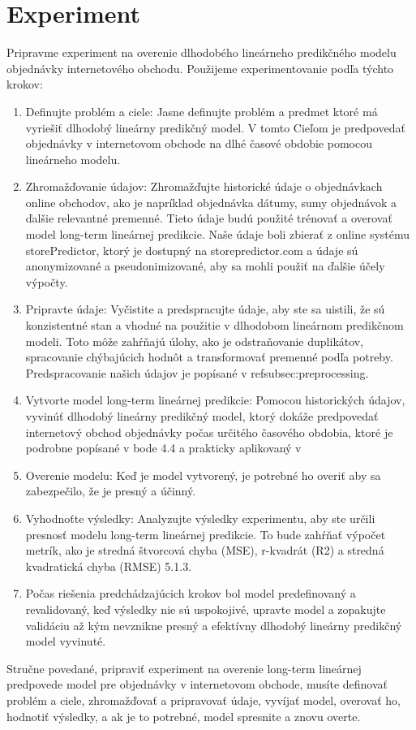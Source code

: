     \section{Experiment}
    Pripravme experiment na overenie dlhodobého lineárneho predikčného modelu objednávky internetového obchodu. Použijeme experimentovanie podľa týchto krokov:
    \begin{enumerate}
    \item Definujte problém a ciele: Jasne definujte problém a predmet ktoré má vyriešiť dlhodobý lineárny predikčný model. V tomto
    Cieľom je predpovedať objednávky v internetovom obchode na dlhé časové obdobie pomocou lineárneho modelu.
    \item  Zhromažďovanie údajov: Zhromažďujte historické údaje o objednávkach online obchodov, ako je napríklad objednávka
    dátumy, sumy objednávok a ďalšie relevantné premenné. Tieto údaje budú použité trénovať a overovať model long-term lineárnej predikcie. Naše údaje boli
    zbierať z online systému storePredictor, ktorý je dostupný na storepredictor.com a údaje sú anonymizované a pseudonimizované,
    aby sa mohli použiť na ďalšie účely výpočty.
    \item  Pripravte údaje: Vyčistite a predspracujte údaje, aby ste sa uistili, že sú konzistentné stan a vhodné na použitie v dlhodobom
    lineárnom predikčnom modeli. Toto môže zahŕňajú úlohy, ako je odstraňovanie duplikátov, spracovanie chýbajúcich hodnôt a transformovať premenné
    podľa potreby. Predspracovanie našich údajov je popísané v ref{subsec:preprocessing}.
    \item  Vytvorte model long-term lineárnej predikcie: Pomocou historických údajov, vyvinúť dlhodobý lineárny predikčný model,
    ktorý dokáže predpovedať internetový obchod objednávky počas určitého časového obdobia, ktoré je podrobne popísané v bode 4.4 a prakticky
    aplikovaný v 
    \item  Overenie modelu: Keď je model vytvorený, je potrebné ho overiť aby sa zabezpečilo, že je presný a účinný.
    \item Vyhodnoťte výsledky: Analyzujte výsledky experimentu, aby ste určili presnosť modelu long-term lineárnej predikcie. To bude zahŕňať
    výpočet metrík, ako je stredná štvorcová chyba (MSE), r-kvadrát (R2) a stredná kvadratická chyba (RMSE) 5.1.3.
    \item Počas riešenia predchádzajúcich krokov bol model predefinovaný a revalidovaný, keď výsledky nie sú uspokojivé, upravte model a zopakujte validáciu
    až kým nevznikne presný a efektívny dlhodobý lineárny predikčný model vyvinuté.
    \end{enumerate}
    Stručne povedané, pripraviť experiment na overenie long-term lineárnej predpovede model pre objednávky v internetovom obchode, musíte definovať
    problém a ciele, zhromažďovať a pripravovať údaje, vyvíjať model, overovať ho, hodnotiť výsledky, a ak je to potrebné, model spresnite a znovu overte.
